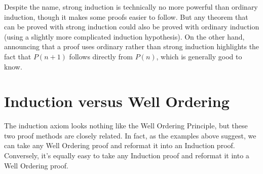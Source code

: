 Despite the name, strong induction is technically no more powerful than
ordinary induction, though it makes some proofs easier to follow.  But any
theorem that can be proved with strong induction could also be proved with
ordinary induction (using a slightly more complicated induction
hypothesis).  On the other hand, announcing that a proof uses ordinary
rather than strong induction highlights the fact that $P(n+1)$ follows
directly from $P(n)$, which is generally good to know.

\begin{problems}
\classproblems
{}
\end{problems}


\section{Induction versus Well Ordering}\label{versusWO}

The induction axiom looks nothing like the Well Ordering Principle, but
these two proof methods are closely related.  In fact, as the examples
above suggest, we can take any Well Ordering proof and reformat it into an
Induction proof.  Conversely, it's equally easy to take any Induction
proof and reformat it into a Well Ordering proof.

\iffalse Here's how to reformat an induction proof and into a Well
Ordering proof : suppose that we have a proof by induction with
hypothesis $P(n)$.  Then we start a Well Ordering proof by assuming the
set of counterexamples to $P$ is nonempty.  Then by Well Ordering there is
a smallest counterexample, $s$, that is, a smallest $s$ such that $P(s)$
is false.

Now we use the proof of $P(0)$ that was part of the Induction proof to
conclude that $s$ must be greater than 0.  Also since $s$ is the smallest
counterexample, we can conclude that $P(s-1)$ must be true.  At this point
we reuse the proof of the inductive step in the Induction proof, which
shows that since $P(s-1)$ true, then $P(s)$ is also true.  This
contradicts the assumption that $P(s)$ is false, so we have the
contradiction needed to complete the Well Ordering Proof that $P(n)$ holds
for all $n \in \naturals$.
\fi

